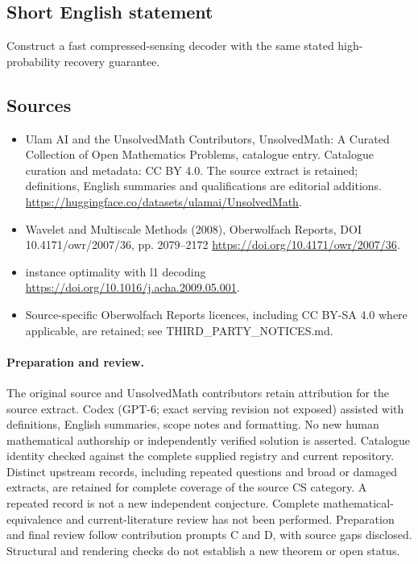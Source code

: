 \documentclass[11pt]{article}
\begin{document}
\subsection{Short English statement}
Construct a fast compressed-sensing decoder with the same stated high-probability recovery guarantee.
\subsection{Sources}
\begin{itemize}
\item[\hypertarget{source:statement:1}{S1}] Ulam AI and the UnsolvedMath Contributors, UnsolvedMath: A Curated Collection of Open Mathematics Problems, catalogue entry. Catalogue curation and metadata: CC BY 4.0. The source extract is retained; definitions, English summaries and qualifications are editorial additions.
\url{https://huggingface.co/datasets/ulamai/UnsolvedMath}.
\item[\hypertarget{source:statement:2}{S2}] Wavelet and Multiscale Methods (2008), Oberwolfach Reports, DOI 10.4171/owr/2007/36, pp. 2079--2172
\url{https://doi.org/10.4171/owr/2007/36}.
\item[\hypertarget{source:statement:3}{S3}] instance optimality with l1 decoding
\url{https://doi.org/10.1016/j.acha.2009.05.001}.
\item Source-specific Oberwolfach Reports licences, including CC BY-SA 4.0 where applicable, are retained; see THIRD\_PARTY\_NOTICES.md.
\end{itemize}
\paragraph{Preparation and review.}
The original source and UnsolvedMath contributors retain attribution for the source extract. Codex (GPT-6; exact serving revision not exposed) assisted with definitions, English summaries, scope notes and formatting. No new human mathematical authorship or independently verified solution is asserted. Catalogue identity checked against the complete supplied registry and current repository. Distinct upstream records, including repeated questions and broad or damaged extracts, are retained for complete coverage of the source CS category. A repeated record is not a new independent conjecture. Complete mathematical-equivalence and current-literature review has not been performed. Preparation and final review follow contribution prompts C and D, with source gaps disclosed. Structural and rendering checks do not establish a new theorem or open status.
\label{end:statement}
\end{document}
